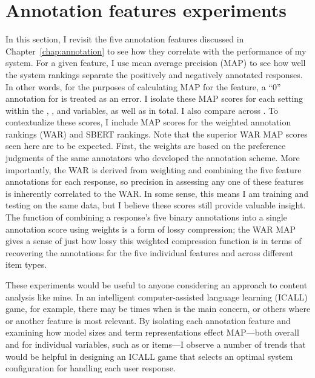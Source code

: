 \section{Annotation features experiments}
\label{sec:exp-annotations}
In this section, I revisit the five annotation features discussed in Chapter~\ref{chap:annotation} to see how they correlate with the performance of my system. For a given feature, I use mean average precision (MAP) to see how well the system rankings separate the positively and negatively annotated responses. In other words, for the purposes of  calculating MAP for the  feature, a ``0'' annotation for  is treated as an error. I isolate these MAP scores for each setting within the , , and  variables, as well as in total. I also compare across . To contextualize these scores, I include MAP scores for the weighted annotation rankings (WAR) and SBERT rankings. Note that the superior WAR MAP scores seen here are to be expected. First, the weights are based on the preference judgments of the same annotators who developed the annotation scheme. More importantly, the WAR is derived from weighting and combining the five feature annotations for each response, so precision in assessing any one of these features is inherently correlated to the WAR. In some sense, this means I am training and testing on the same data, but I believe these scores still provide valuable insight. The function of combining a response's five binary annotations into a single annotation score using weights is a form of lossy compression; the WAR MAP gives a sense of just how lossy this weighted compression function is in terms of recovering the annotations for the five individual features and across different item types. 

These experiments would be useful to anyone considering an approach to content analysis like mine. In an intelligent computer-assisted language learning (ICALL) game, for example, there may be times when  is the main concern, or others where  or another feature is most relevant. By isolating each annotation feature and examining how model sizes and term representations effect MAP---both overall and for individual variables, such as  or  items---I observe a number of trends that would be helpful in designing an ICALL game that selects an optimal system configuration for handling each user response.

